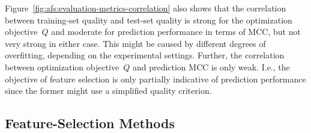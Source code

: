 \documentclass{article}
\theoremstyle{definition}
\begin{document}
Figure~\ref{fig:afs:evaluation-metrics-correlation} also shows that the correlation between training-set quality and test-set quality is strong for the optimization objective~$Q$ and moderate for prediction performance in terms of MCC, but not very strong in either case.
This might be caused by different degrees of overfitting, depending on the experimental settings.
Further, the correlation between optimization objective~$Q$ and prediction MCC is only weak.
I.e., the objective of feature selection is only partially indicative of prediction performance since the former might use a simplified quality criterion.

\subsection{Feature-Selection Methods}
\label{sec:afs:evaluation:feature-selection}
\end{document}
